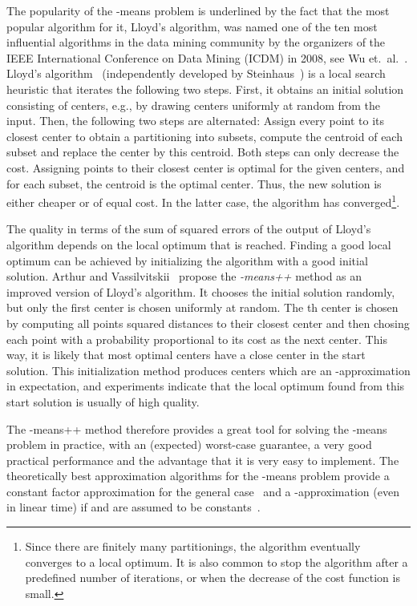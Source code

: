 \documentclass[a4paper]{scrartcl}
\makeatletter
\newcommand{\eg}{e.\nolinebreak[4]\hspace{0.125em}\nolinebreak[4]g.,\@\xspace}
\makeatother
\begin{document}
The popularity of the -means problem is underlined by the fact that the most popular algorithm for it, Lloyd's algorithm, was named one of the ten most influential algorithms in the data mining community by the organizers of the IEEE International Conference on Data Mining (ICDM) in 2008, see Wu et.\ al.~\cite{WKQGYMMcLNLYZSHS08}.
Lloyd's algorithm~\cite{L82} (independently developed by Steinhaus~\cite{S56}) is a local search heuristic that iterates the following two steps. First, it obtains an initial solution consisting of  centers, \eg by drawing  centers uniformly at random from the input. Then, the following two steps are alternated: Assign every point to its closest center to obtain a partitioning into  subsets, compute the centroid of each subset and replace the center by this centroid. Both steps can only decrease the cost. Assigning points to their closest center is optimal for the given centers, and for each subset, the centroid is the optimal center. Thus, the new solution is either cheaper or of equal cost. In the latter case, the algorithm has converged\footnote{Since there are finitely many partitionings, the algorithm eventually converges to a local optimum. It is also common to stop the algorithm after a predefined number of iterations, or when the decrease of the cost function is small.}.

The quality in terms of the sum of squared errors of the output of Lloyd's algorithm depends on the local optimum that is reached. Finding a good local optimum can be achieved by initializing the algorithm with a good initial solution. Arthur and Vassilvitskii~\cite{AV07} propose the \emph{-means++} method as an improved version of Lloyd's algorithm. It chooses the initial solution randomly, but only the first center is chosen uniformly at random. The th center is chosen by computing all points squared distances to their closest center and then chosing each point with a probability proportional to its cost as the next center. This way, it is likely that most optimal centers have a close center in the start solution. This initialization method produces centers which are an -approximation in expectation, and experiments indicate that the local optimum found from this start solution is usually of high quality.

The -means++ method therefore provides a great tool for solving the -means problem in practice, with an (expected) worst-case guarantee, a very good practical performance and the advantage that it is very easy to implement. The theoretically best approximation algorithms for the -means problem provide a constant factor approximation for the general case~\cite{JV01,KMNPSW04} and a -approximation (even in linear time) if  and  are assumed to be constants~\cite{FL11}.
\end{document}
